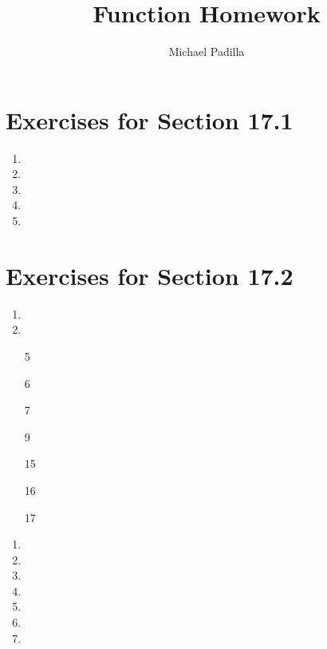 \documentclass[12pt]{article}
\title{Function Homework}
\author{Michael Padilla}
\begin{document}
 
\maketitle
\section*{Exercises for Section 17.1}
\begin{enumerate}
	\item 
	\item 
	\item 
	\item 
	\item 
\end{enumerate}
\section*{Exercises for Section 17.2}
\begin{enumerate}
	\item 
	\item 
	\item [5]
	\item [6]
	\item [7]
	\item [9]
	\item [15]
	\item [16]
	\item [17]
\end{enumerate}
\begin{enumerate}
	\item 
	\item 
	\item 
	\item 
	\item 
	\item 
	\item 
\end{enumerate}
\end{document}
